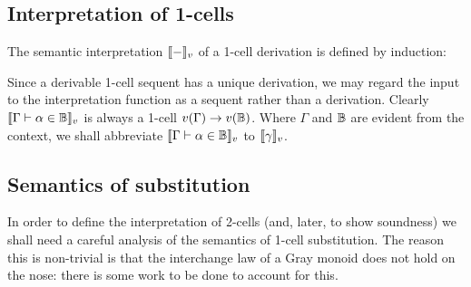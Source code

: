 \documentclass{robinthesisdraft}
\begin{document}
\subsection{Interpretation of 1-cells}
The semantic interpretation $\semint-$ of a 1-cell
derivation is defined by induction:
\begin{itemize}
\item $\Bigl\llbracket	\begin{prooftree}
	\justifies A\in\C \proves A\in\C \using (\C)
\end{prooftree} \Bigr\rrbracket_{v} = 1_{v(\C)}$,
\item $\left\llbracket\begin{prooftree}
		\[[\pi_{1}]\justifies\Gamma_{1}\proves \alpha_{1}\in \A_{1}\]
		\quad\cdots\quad
		\[[\pi_{n}]\justifies\Gamma_{n}\proves \alpha_{n}\in \A_{n}\]
		\justifies
		\Gamma_{1},\dots,\Gamma_{n} \proves f(\alpha_{1},\dots,\alpha_{n})\in\CB
		\using f(\bullet)
	\end{prooftree}\right\rrbracket_{v}$
	\newline\vskip1ex\strut\hfil$= v(f)\o\Bigl(
	\biggl\llbracket\begin{prooftree}
		[\pi_{1}]\justifies\Gamma_{1}\proves \alpha_{1}\in \A_{1}
	\end{prooftree}\biggr\rrbracket_{v}
	\tn\cdots\tn
	\biggl\llbracket\begin{prooftree}
		[\pi_{n}]\justifies\Gamma_{n}\proves \alpha_{n}\in \A_{n}
	\end{prooftree}\biggr\rrbracket_{v}
	\Bigr)$.
\end{itemize}
Since a derivable 1-cell sequent has a unique derivation, we may
regard the input to the interpretation function as a sequent rather
than a derivation. Clearly $\semint{\Gamma\proves \alpha\in\CB}$
is always a 1-cell $v(\Gamma)\to v(\mathbb{B})$.
%
Where $\Gamma$ and $\mathbb{B}$ are evident from the context, we shall
abbreviate $\semint{\Gamma\proves \alpha\in\CB}$ to $\semint{\gamma}$.

\subsection{Semantics of substitution}
In order to define the interpretation of 2-cells (and, later, to
show soundness) we shall need a careful analysis of the semantics
of 1-cell substitution. The reason this is non-trivial is that the
interchange law of a Gray monoid does not hold on the nose: there
is some work to be done to account for this.
\end{document}
